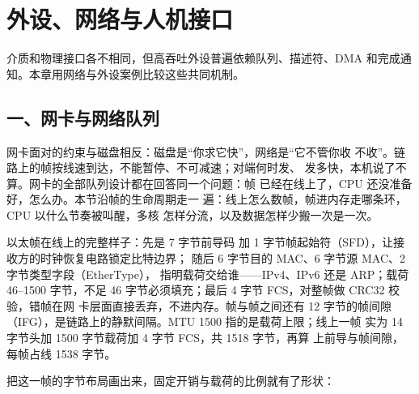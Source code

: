 \chapter{外设、网络与人机接口}

\begin{keyidea}
介质和物理接口各不相同，但高吞吐外设普遍依赖队列、描述符、DMA 和完成通知。本章用网络与外设案例比较这些共同机制。
\end{keyidea}

\section{一、网卡与网络队列}

网卡面对的约束与磁盘相反：磁盘是“你求它快”，网络是“它不管你收
不收”。链路上的帧按线速到达，不能暂停、不可减速；对端何时发、
发多快，本机说了不算。网卡的全部队列设计都在回答同一个问题：帧
已经在线上了，CPU 还没准备好，怎么办。本节沿帧的生命周期走一
遍：线上怎么数帧，帧进内存走哪条环，CPU 以什么节奏被叫醒，多核
怎样分流，以及数据怎样少搬一次是一次。

以太帧在线上的完整样子：先是 7 字节前导码
加 1 字节帧起始符（SFD），让接收方的时钟恢复电路锁定比特边界；
随后 6 字节目的 MAC、6 字节源 MAC、2 字节类型字段（EtherType），
指明载荷交给谁——IPv4、IPv6 还是 ARP；载荷 46--1500 字节，不足
46 字节必须填充；最后 4 字节 FCS，对整帧做 CRC32 校验，错帧在网
卡层面直接丢弃，不进内存。帧与帧之间还有 12 字节的帧间隙
（IFG），是链路上的静默间隔。MTU 1500 指的是载荷上限；线上一帧
实为 14 字节头加 1500 字节载荷加 4 字节 FCS，共 1518 字节，再算
上前导与帧间隙，每帧占线 1538 字节。

把这一帧的字节布局画出来，固定开销与载荷的比例就有了形状：

